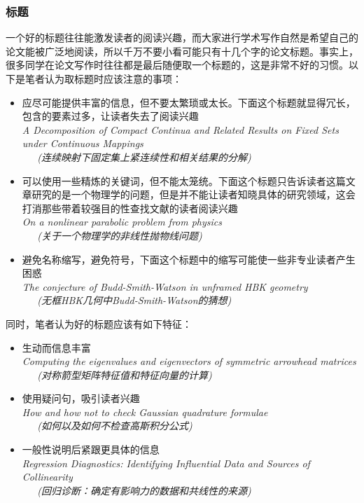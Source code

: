 \documentclass{formatBook}
\begin{document}
\subsubsection{标题}
一个好的标题往往能激发读者的阅读兴趣，而大家进行学术写作自然是希望自己的论文能被广泛地阅读，所以千万不要小看可能只有十几个字的论文标题。事实上，很多同学在论文写作时往往都是最后随便取一个标题的，这是非常不好的习惯。以下是笔者认为取标题时应该注意的事项：
\begin{itemize}
    \item 应尽可能提供丰富的信息，但不要太繁琐或太长。下面这个标题就显得冗长，包含的要素过多，让读者失去了阅读兴趣\\
    \textit{A Decomposition of Compact Continua and Related Results on Fixed Sets under Continuous Mappings \\ \ \ \  (连续映射下固定集上紧连续性和相关结果的分解)}
    \item 可以使用一些精炼的关键词，但不能太笼统。下面这个标题只告诉读者这篇文章研究的是一个物理学的问题，但是并不能让读者知晓具体的研究领域，这会打消那些带着较强目的性查找文献的读者阅读兴趣\\
    \textit{On a nonlinear parabolic problem from physics \\ \ \ \  (关于一个物理学的非线性抛物线问题)}
    \item 避免名称缩写，避免符号，下面这个标题中的缩写可能使一些非专业读者产生困惑\\
    \textit{The conjecture of Budd-Smith-Watson in unframed HBK geometry  \\ \ \ \ (无框HBK几何中Budd-Smith-Watson的猜想)}
\end{itemize}
\par
同时，笔者认为好的标题应该有如下特征：
\begin{itemize}
    \item 生动而信息丰富\\ 
    \textit{Computing the eigenvalues and eigenvectors of symmetric arrowhead matrices \\ \ \ \ (对称箭型矩阵特征值和特征向量的计算)}
    \item 使用疑问句，吸引读者兴趣\\ 
    \textit{How and how not to check Gaussian quadrature formulae \\ \ \ \ (如何以及如何不检查高斯积分公式)}
    \item 一般性说明后紧跟更具体的信息\\
    \textit{Regression Diagnostics: Identifying Influential Data and Sources of Collinearity \\  \ \ \ 
    (回归诊断：确定有影响力的数据和共线性的来源)}
\end{itemize}
\end{document}
